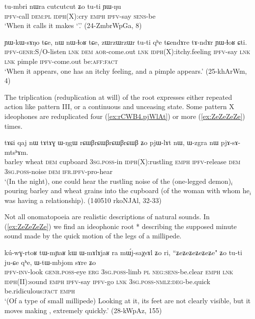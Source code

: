 \begin{exe}
\ex \label{ex:cutcutcut}
\gll    tu-mbri nɯra cutcutcut ʑo tu-ti ɲɯ-ŋu  \\
  \textsc{ipfv}-call \textsc{dem}:\textsc{pl} \textsc{idph}(X):cry \textsc{emph} \textsc{ipfv}-say \textsc{sens}-be \\
\glt  `When it calls it makes `'.' (24-ZmbrWpGa, 8)
\end{exe}

\begin{exe}
\ex \label{ex:zWrzWrzWr}
\gll ɲɯ-kɯ-sɤŋo tɕe, nɯ nɯ-ɬoʁ tɕe, zɯrzɯrzɯr tu-ti qʰe tɕendɤre tɤ-ndɤr ɲɯ-ɬoʁ ɕti.	\\
\textsc{ipfv}-\textsc{genr}:S/O-listen \textsc{lnk} \textsc{dem} \textsc{aor}-come.out \textsc{lnk} \textsc{idph}(X):itchy.feeling \textsc{ipfv}-say \textsc{lnk}  \textsc{lnk} pimple \textsc{ipfv}-come.out be:\textsc{aff}:\textsc{fact} \\
\glt `When it appears, one has an itchy feeling, and a pimple appears.' (25-khArWm, 4)
\end{exe}

The triplication (reduplication at will) of the root expresses either repeated action like pattern III, or a continuous and unceasing state. Some pattern X ideophones are reduplicated four (\ref{ex:rCWB4.pjWlAt}) or more (\ref{ex:ZeZeZeZe}) times. 

\begin{exe}
\ex \label{ex:rCWB4.pjWlAt}
\gll tɤɕi qaj nɯ tɤtɤɣ ɯ-ŋgɯ rɕɯβrɕɯβrɕɯβrɕɯβ ʑo pjɯ-lɤt nɯ, ɯ-zgra nɯ pjɤ-sɤ-mtsʰɤm.  \\
barley wheat \textsc{dem} cupboard \textsc{3sg}.\textsc{poss}-in \textsc{idph}(X):rustling \textsc{emph} \textsc{ipfv}-release \textsc{dem} \textsc{3sg}.\textsc{poss}-noise \textsc{dem} \textsc{ifr}.\textsc{ipfv}-pro-hear \\
\glt `(In the night), one could hear the rustling noise of the (one-legged demon)$_i$ pouring barley and wheat grains into the cupboard (of the woman with whom he$_i$ was having a relationship). (140510 rkoNJAl, 32-33)
\end{exe}

Not all onomatopoeia are realistic descriptions of natural sounds. In (\ref{ex:ZeZeZeZe}) we find an ideophonic root * describing the supposed minute sound made by the quick motion of the legs of a millipede.

\begin{exe}
\ex \label{ex:ZeZeZeZe}
\gll kú-wɣ-rtoʁ tɯ-mɲaʁ kɯ ɯ-mɤlɤjaʁ ra mɯ́j-saχsɤl ʑo ri, ``ʑeʑeʑeʑeʑeʑe" ʑo tu-ti ju-ɕe qʰe, ɯ-tɯ-mbjom sɤre ʑo \\
\textsc{ipfv}-\textsc{inv}-look \textsc{genr}.\textsc{poss}-eye \textsc{erg} \textsc{3sg}.\textsc{poss}-limb \textsc{pl} \textsc{neg}:\textsc{sens}-be.clear \textsc{emph} \textsc{lnk} \textsc{idph}(II):sound \textsc{emph} \textsc{ipfv}-say \textsc{ipfv}-go \textsc{lnk} \textsc{3sg}.\textsc{poss}-\textsc{nmlz}:\textsc{deg}-be.quick be.ridiculous:\textsc{fact} \textsc{emph} \\
\glt `(Of a type of small millipede) Looking at it, its feet are not clearly visible, but it moves making , extremely quickly.' (28-kWpAz, 155)
\end{exe} 


